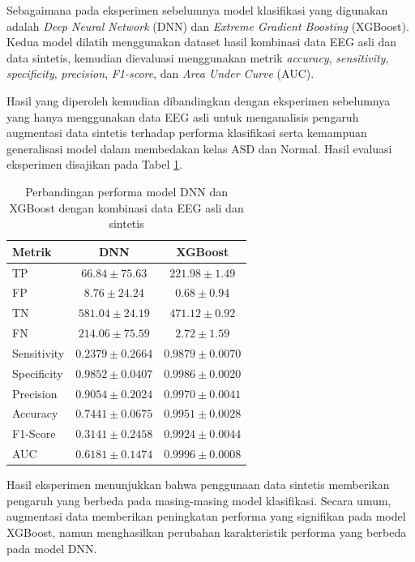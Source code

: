 Sebagaimana pada eksperimen sebelumnya model klasifikasi yang digunakan adalah \textit{Deep Neural Network} (DNN) dan \textit{Extreme Gradient Boosting} (XGBoost). Kedua model dilatih menggunakan dataset hasil kombinasi data EEG asli dan data sintetis, kemudian dievaluasi menggunakan metrik \textit{accuracy}, \textit{sensitivity}, \textit{specificity}, \textit{precision}, \textit{F1-score}, dan \textit{Area Under Curve} (AUC).

Hasil yang diperoleh kemudian dibandingkan dengan eksperimen sebelumnya yang hanya menggunakan data EEG asli untuk menganalisis pengaruh augmentasi data sintetis terhadap performa klasifikasi serta kemampuan generalisasi model dalam membedakan kelas ASD dan Normal. Hasil evaluasi eksperimen disajikan pada Tabel \ref{tab:dnn_xgb_comparison}.

\begin{table}[H]
\centering
\caption{Perbandingan performa model DNN dan XGBoost dengan kombinasi data EEG asli dan sintetis}
\label{tab:dnn_xgb_comparison}
\renewcommand{\arraystretch}{1.1}
\begin{tabular}{lcc}
\toprule
\textbf{Metrik} & \textbf{DNN} & \textbf{XGBoost} \\
\midrule
TP          & $66.84 \pm 75.63$   & $221.98 \pm 1.49$ \\
FP          & $8.76 \pm 24.24$    & $0.68 \pm 0.94$ \\
TN          & $581.04 \pm 24.19$  & $471.12 \pm 0.92$ \\
FN          & $214.06 \pm 75.59$  & $2.72 \pm 1.59$ \\
\midrule
Sensitivity & $0.2379 \pm 0.2664$ & $0.9879 \pm 0.0070$ \\
Specificity & $0.9852 \pm 0.0407$ & $0.9986 \pm 0.0020$ \\
Precision   & $0.9054 \pm 0.2024$ & $0.9970 \pm 0.0041$ \\
Accuracy    & $0.7441 \pm 0.0675$ & $0.9951 \pm 0.0028$ \\
F1-Score    & $0.3141 \pm 0.2458$ & $0.9924 \pm 0.0044$ \\
AUC         & $0.6181 \pm 0.1474$ & $0.9996 \pm 0.0008$ \\
\bottomrule
\end{tabular}
\end{table}

Hasil eksperimen menunjukkan bahwa penggunaan data sintetis memberikan pengaruh yang berbeda pada masing-masing model klasifikasi. Secara umum, augmentasi data memberikan peningkatan performa yang signifikan pada model XGBoost, namun menghasilkan perubahan karakteristik performa yang berbeda pada model DNN.

